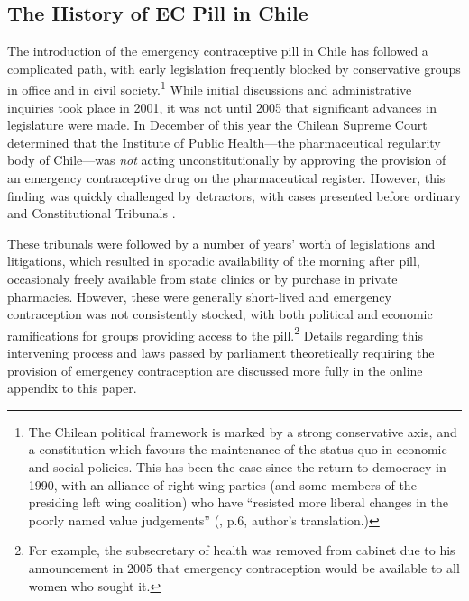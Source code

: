\subsection{The History of EC Pill in Chile}
\label{TEENsscn:Chile}
The introduction of the emergency contraceptive pill in Chile has followed 
a complicated path, with early legislation frequently blocked by conservative 
groups in office and in civil society.\footnote{The Chilean political 
framework is marked by a strong conservative axis, and a constitution which 
favours the maintenance of the status quo in economic and social policies.  
This has been the case since the return to democracy in 1990, with an 
alliance of right wing parties (and some members of the presiding left wing 
coalition) who have ``resisted more liberal changes in the poorly named value 
judgements''  (\citet{CasasBecerra2008}, p.6, author's translation.)}  While 
initial discussions and administrative inquiries took place in 2001, it was 
not until 2005 that significant advances in legislature were made. In 
December of this year the Chilean Supreme Court determined that the Institute 
of Public Health---the pharmaceutical regularity body of Chile---was 
\emph{not} acting unconstitutionally by approving the provision of an 
emergency contraceptive drug on the pharmaceutical register.  However, this 
finding was quickly challenged by detractors, with cases presented before 
ordinary and Constitutional Tribunals \citep{CasasBecerra2008}.

These tribunals were followed by a number of years' worth of legislations and
litigations, which resulted in sporadic availability of the morning
after pill, occasionaly freely available from state clinics or by purchase in
private pharmacies.  However, these were generally short-lived and emergency
contraception was not consistently stocked, with both political and economic 
ramifications for groups providing access to the pill.\footnote{For example,
the subsecretary of health was removed from cabinet due to his announcement
in 2005 that emergency contraception would be available to all women who sought
it.}  Details regarding this intervening process and laws passed by parliament
theoretically requiring the provision of emergency contraception are discussed 
more fully in the online appendix to this paper.

